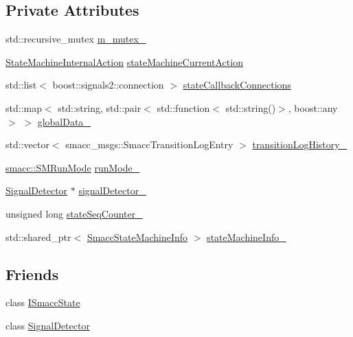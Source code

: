 \subsection*{Private Attributes}
\begin{DoxyCompactItemize}
\item 
std\+::recursive\+\_\+mutex \hyperlink{classsmacc_1_1ISmaccStateMachine_aac785541646e5c517273bf31072505a1}{m\+\_\+mutex\+\_\+}
\item 
\hyperlink{namespacesmacc_a0889aff43c93fe5285109819d2898144}{State\+Machine\+Internal\+Action} \hyperlink{classsmacc_1_1ISmaccStateMachine_a654a98ba86c4c1013ac3c371f293d950}{state\+Machine\+Current\+Action}
\item 
std\+::list$<$ boost\+::signals2\+::connection $>$ \hyperlink{classsmacc_1_1ISmaccStateMachine_aaf98bb0edaa5d8c84767e4acfad3548d}{state\+Callback\+Connections}
\item 
std\+::map$<$ std\+::string, std\+::pair$<$ std\+::function$<$ std\+::string()$>$, boost\+::any $>$ $>$ \hyperlink{classsmacc_1_1ISmaccStateMachine_ad2f9dae184ea942db632ac4532a10a91}{global\+Data\+\_\+}
\item 
std\+::vector$<$ smacc\+\_\+msgs\+::\+Smacc\+Transition\+Log\+Entry $>$ \hyperlink{classsmacc_1_1ISmaccStateMachine_af682d5fce5bb7c959e2b8814dae50023}{transition\+Log\+History\+\_\+}
\item 
\hyperlink{namespacesmacc_a3e4f79486ea6ea6342dd3c712d16a4f6}{smacc\+::\+S\+M\+Run\+Mode} \hyperlink{classsmacc_1_1ISmaccStateMachine_a9f8cfbf577f7ae7a48b7a328e2e6b589}{run\+Mode\+\_\+}
\item 
\hyperlink{classsmacc_1_1SignalDetector}{Signal\+Detector} $\ast$ \hyperlink{classsmacc_1_1ISmaccStateMachine_a3982eb671f5f001cb047d3a467789986}{signal\+Detector\+\_\+}
\item 
unsigned long \hyperlink{classsmacc_1_1ISmaccStateMachine_ab41ee07d20715142e2f7c92d551b2bd6}{state\+Seq\+Counter\+\_\+}
\item 
std\+::shared\+\_\+ptr$<$ \hyperlink{classsmacc_1_1introspection_1_1SmaccStateMachineInfo}{Smacc\+State\+Machine\+Info} $>$ \hyperlink{classsmacc_1_1ISmaccStateMachine_a0914aa27c3f51374c338d89a32b135d1}{state\+Machine\+Info\+\_\+}
\end{DoxyCompactItemize}
\subsection*{Friends}
\begin{DoxyCompactItemize}
\item 
class \hyperlink{classsmacc_1_1ISmaccStateMachine_ab907e4cdbf326246355f56640780162e}{I\+Smacc\+State}
\item 
class \hyperlink{classsmacc_1_1ISmaccStateMachine_a9fb9044f83e768849d1b42d9d0d5508e}{Signal\+Detector}
\end{DoxyCompactItemize}


